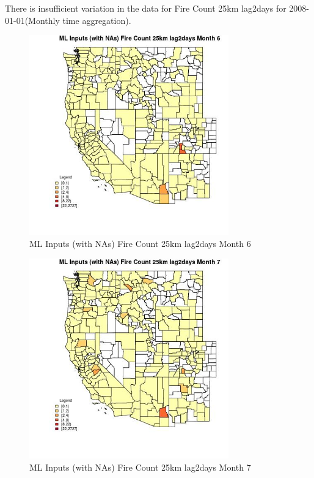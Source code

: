 There is insufficient variation in the data for Fire Count 25km lag2days for 2008-01-01(Monthly time aggregation). 
 

\begin{figure} 
\centering  
\includegraphics[width=0.77\textwidth]{Code_Outputs/Report_ML_input_PM25_Step4_part_f_de_duplicated_aveswNAs_CountyFire_Count_25km_lag2daysmedianMonth6.jpg} 
\caption{\label{fig:Report_ML_input_PM25_Step4_part_f_de_duplicated_aveswNAsCountyFire_Count_25km_lag2daysmedianMonth6}ML Inputs (with NAs) Fire Count 25km lag2days Month 6} 
\end{figure} 
 

\begin{figure} 
\centering  
\includegraphics[width=0.77\textwidth]{Code_Outputs/Report_ML_input_PM25_Step4_part_f_de_duplicated_aveswNAs_CountyFire_Count_25km_lag2daysmedianMonth7.jpg} 
\caption{\label{fig:Report_ML_input_PM25_Step4_part_f_de_duplicated_aveswNAsCountyFire_Count_25km_lag2daysmedianMonth7}ML Inputs (with NAs) Fire Count 25km lag2days Month 7} 
\end{figure} 
 

